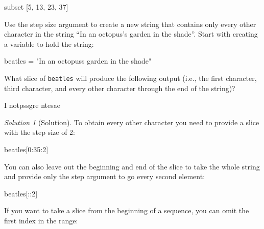 \documentclass[
  letterpaper,
  DIV=11,
  numbers=noendperiod]{scrartcl}
\newenvironment{Shaded}{\begin{snugshade}}{\end{snugshade}}
\newcommand{\DecValTok}[1]{\textcolor[rgb]{0.68,0.00,0.00}{#1}}
\newcommand{\NormalTok}[1]{\textcolor[rgb]{0.00,0.23,0.31}{#1}}
\newcommand{\OperatorTok}[1]{\textcolor[rgb]{0.37,0.37,0.37}{#1}}
\newcommand{\StringTok}[1]{\textcolor[rgb]{0.13,0.47,0.30}{#1}}
\theoremstyle{remark}
\newtheorem*{solution}{Solution}
\begin{document}
\begin{Shaded}
\begin{Highlighting}[]
\NormalTok{subset [5, 13, 23, 37]}
\end{Highlighting}
\end{Shaded}

Use the step size argument to create a new string that contains only
every other character in the string ``In an octopus's garden in the
shade''. Start with creating a variable to hold the string:

\begin{Shaded}
\begin{Highlighting}[]
\NormalTok{beatles }\OperatorTok{=} \StringTok{"In an octopus\textquotesingle{}s garden in the shade"}
\end{Highlighting}
\end{Shaded}

What slice of \texttt{beatles} will produce the following output (i.e.,
the first character, third character, and every other character through
the end of the string)?

\begin{Shaded}
\begin{Highlighting}[]
\NormalTok{I notpssgre ntesae}
\end{Highlighting}
\end{Shaded}

\begin{solution}[Solution]
To obtain every other character you need to provide a slice with the
step size of 2:

\begin{Shaded}
\begin{Highlighting}[]
\NormalTok{beatles[}\DecValTok{0}\NormalTok{:}\DecValTok{35}\NormalTok{:}\DecValTok{2}\NormalTok{]}
\end{Highlighting}
\end{Shaded}

You can also leave out the beginning and end of the slice to take the
whole string and provide only the step argument to go every second
element:

\begin{Shaded}
\begin{Highlighting}[]
\NormalTok{beatles[::}\DecValTok{2}\NormalTok{]}
\end{Highlighting}
\end{Shaded}

\end{solution}

If you want to take a slice from the beginning of a sequence, you can
omit the first index in the range:
\end{document}
